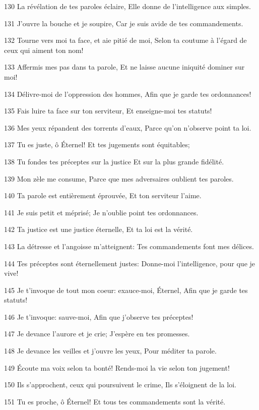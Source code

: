 \par 130 La révélation de tes paroles éclaire, Elle donne de l'intelligence aux simples.
\par 131 J'ouvre la bouche et je soupire, Car je suis avide de tes commandements.
\par 132 Tourne vers moi ta face, et aie pitié de moi, Selon ta coutume à l'égard de ceux qui aiment ton nom!
\par 133 Affermis mes pas dans ta parole, Et ne laisse aucune iniquité dominer sur moi!
\par 134 Délivre-moi de l'oppression des hommes, Afin que je garde tes ordonnances!
\par 135 Fais luire ta face sur ton serviteur, Et enseigne-moi tes statuts!
\par 136 Mes yeux répandent des torrents d'eaux, Parce qu'on n'observe point ta loi.
\par 137 Tu es juste, ô Éternel! Et tes jugements sont équitables;
\par 138 Tu fondes tes préceptes sur la justice Et sur la plus grande fidélité.
\par 139 Mon zèle me consume, Parce que mes adversaires oublient tes paroles.
\par 140 Ta parole est entièrement éprouvée, Et ton serviteur l'aime.
\par 141 Je suis petit et méprisé; Je n'oublie point tes ordonnances.
\par 142 Ta justice est une justice éternelle, Et ta loi est la vérité.
\par 143 La détresse et l'angoisse m'atteignent: Tes commandements font mes délices.
\par 144 Tes préceptes sont éternellement justes: Donne-moi l'intelligence, pour que je vive!
\par 145 Je t'invoque de tout mon coeur: exauce-moi, Éternel, Afin que je garde tes statuts!
\par 146 Je t'invoque: sauve-moi, Afin que j'observe tes préceptes!
\par 147 Je devance l'aurore et je crie; J'espère en tes promesses.
\par 148 Je devance les veilles et j'ouvre les yeux, Pour méditer ta parole.
\par 149 Écoute ma voix selon ta bonté! Rends-moi la vie selon ton jugement!
\par 150 Ils s'approchent, ceux qui poursuivent le crime, Ils s'éloignent de la loi.
\par 151 Tu es proche, ô Éternel! Et tous tes commandements sont la vérité.
